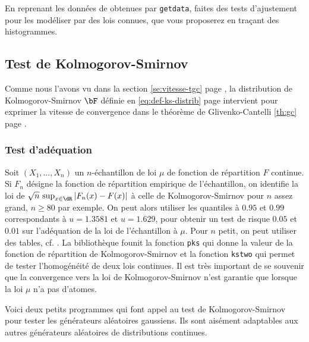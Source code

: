 \begin{exo}
  En reprenant les données de \SB{} obtenues par \texttt{getdata}, faites des
  tests d'ajustement pour les modéliser par des lois connues, que vous
  proposerez en traçant des histogrammes.
\end{exo}


%
\subsection{Test de Kolmogorov-Smirnov}\label{ss:test-ks}
%

Comme nous l'avons vu dans la section \ref{se:vitesse-tgc} page
\pageref{se:vitesse-tgc}, la distribution de Kolmogorov-Smirnov $\bF$ définie
en \eqref{eq:def-ks-distrib} page \pageref{eq:def-ks-distrib} intervient pour
exprimer la vitesse de convergence dans le théorème de Glivenko-Cantelli
\ref{th:gc} page \pageref{th:gc}.

\subsubsection{Test d'adéquation}

Soit $(X_1,\ldots,X_n)$ un $n$-échantillon de loi $\mu$ de fonction de répartition
$F$ continue. Si $F_n$ désigne la fonction de répartition empirique de
l'échantillon, on identifie la loi de $\sqrt{n}\,\sup _{x \in \dR}
|F_n(x)-F(x)|$ à celle de Kolmogorov-Smirnov pour $n$ assez grand, $n \geq 80$
par exemple. On peut alors utiliser les quantiles à $0.95$ et $0.99$
correspondants à $u=1.3581$ et $u=1.629$, pour obtenir un test de risque
$0.05$ et $0.01$ sur l'adéquation de la loi de l'échantillon à $\mu$. Pour $n$
petit, on peut utiliser des tables, cf. \cite{saporta}.  La bibliothèque \SB{}
founit la fonction \texttt{pks} qui donne la valeur de la fonction de
répartition de Kolmogorov-Smirnov et la fonction \texttt{kstwo} qui permet de
tester l'homogénéité de deux lois continues. Il est très important de se
souvenir que la convergence vers la loi de Kolmogorov-Smirnov n'est garantie
que lorsque la loi $\mu$ n'a pas d'atomes.

\begin{exo}
  Voici deux petits programmes \ML{} qui font appel au test de
  Kolmogorov-Smirnov pour tester les générateurs aléatoires gaussiens. Ils
  sont aisément adaptables aux autres générateurs aléatoires de distributions
  continues.
\end{exo}

